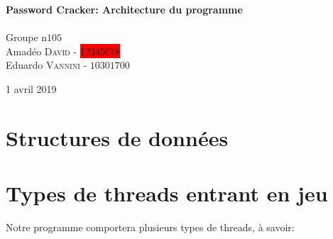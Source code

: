 \documentclass{article}
\begin{document}
\begin{titlepage}
	{\huge\bfseries Password Cracker: Architecture du programme}\\[0.4cm] %
	
	\HRule\\[1.5cm]
	
	
	Groupe n\degree$105$\\[0.2cm]
	Amadéo \textsc{David}  - \colorbox{red}{12345678}\\%
	Eduardo \textsc{Vannini} - $10301700$%
	
	
	\vfill\vfill\vfill %
	
	{\large 1\ier{} avril 2019} %
	
	
	\vfill %
	
\end{titlepage}


\section{Structures de données}
\label{sec:data_structures}

\section{Types de threads entrant en jeu}
	
	\noindent
	Notre programme comportera plusieurs types de threads, à savoir:
	
\end{document}
